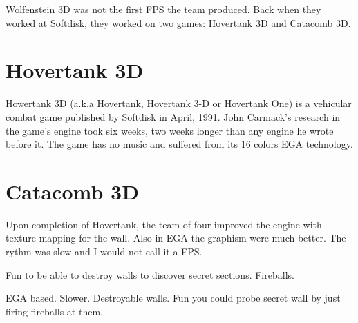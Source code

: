 Wolfenstein 3D was not the first FPS the team produced. Back when they worked at Softdisk, they worked on two games: Hovertank 3D and Catacomb 3D.\\
\par
\section{Hovertank 3D}
Howertank 3D (a.k.a Hovertank, Hovertank 3-D or Hovertank One)  is a vehicular combat game published by Softdisk in April, 1991. John Carmack's research in the game's engine took six weeks, two weeks longer than any engine he wrote before it. The game has no music and suffered from its 16 colors EGA technology.
\begin{figure}[H]
\centering
{}
\end{figure}

\begin{figure}[H]
\centering
{}
\end{figure}



\section{Catacomb 3D}
Upon completion of Hovertank, the team of four improved the engine with texture mapping for the wall. Also in EGA the graphism were much better. The rythm was slow and I would not call it a FPS. 
\begin{figure}[H]
\centering
{}
\end{figure}

Fun to be able to destroy walls to discover secret sections. Fireballs.

\begin{figure}[H]
\centering
{}
\end{figure}

EGA based. Slower. Destroyable walls. Fun you could probe secret wall by just firing fireballs at them.



